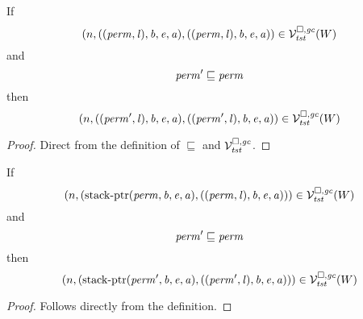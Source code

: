 \begin{lemma}
  \label{lem:cap-in-lrv-mono-perm}
  If
  \[
    \npair{((\perm,\lin),\baddr,\eaddr,\aaddr),((\perm,\lin),\baddr,\eaddr,\aaddr)} \in \lrvg{\trust}(W)
  \]
  and
  \[
    \perm' \sqsubseteq \perm
  \]
  then
  \[
    \npair{((\perm',\lin),\baddr,\eaddr,\aaddr),((\perm',\lin),\baddr,\eaddr,\aaddr)} \in \lrvg{\trust}(W)
  \]
\end{lemma}
\begin{proof}
  Direct from the definition of $\sqsubseteq$ and $\lrvg{\trust}$.
\end{proof}

\begin{lemma}
\label{lem:stkptr-in-lrv-mono-perm}
  If
  \[
    \npair{(\stkptr{\perm,\baddr,\eaddr,\aaddr},((\perm,\lin),\baddr,\eaddr,\aaddr))} \in \lrvg{\trust}(W)
  \]
  and
  \[
    \perm' \sqsubseteq \perm
  \]
  then
  \[
    \npair{(\stkptr{\perm',\baddr,\eaddr,\aaddr},((\perm',\lin),\baddr,\eaddr,\aaddr))} \in \lrvg{\trust}(W)
  \]
\end{lemma}
\begin{proof}
  Follows directly from the definition.
\end{proof}


